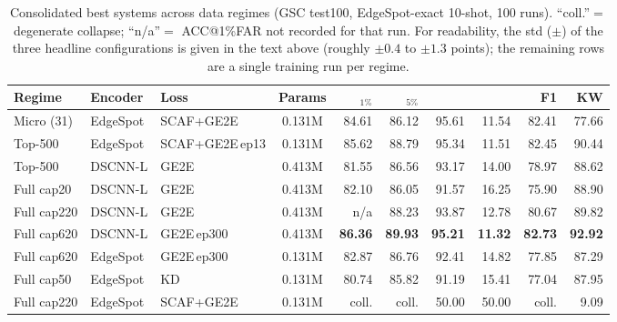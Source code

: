 \documentclass[12pt,a4paper]{report}
\newcommand{\acc}{\text{ACC}}
\newcommand{\eer}{\text{EER}}
\newcommand{\auc}{\text{AUC}}
\newcommand{\best}[1]{\textbf{#1}}
\begin{document}
\begin{table}[H]
\centering
\caption{Consolidated best systems across data regimes (GSC test100,
EdgeSpot-exact 10-shot, 100 runs). ``coll.''$=$ degenerate collapse; ``n/a''$=$
ACC@1\%FAR not recorded for that run. For readability, the std ($\pm$) of the three
headline configurations is given in the text above (roughly $\pm0.4$ to $\pm1.3$
points); the remaining rows are a single training run per regime.}
\label{tab:final}
\scriptsize
\setlength{\tabcolsep}{3pt}
\begin{tabular}{l l l c r r r r r r}
\toprule
\textbf{Regime} & \textbf{Encoder} & \textbf{Loss} & \textbf{Params} &
\acc$_{1\%}$ & \acc$_{5\%}$ & \auc & \eer & F1 & KW\\
\midrule
Micro (31)    & EdgeSpot & SCAF+GE2E      & 0.131M & 84.61 & 86.12 & 95.61 & 11.54 & 82.41 & 77.66 \\
Top-500       & EdgeSpot & SCAF+GE2E\,ep13& 0.131M & 85.62 & 88.79 & 95.34 & 11.51 & 82.45 & 90.44 \\
Top-500       & DSCNN-L  & GE2E           & 0.413M & 81.55 & 86.56 & 93.17 & 14.00 & 78.97 & 88.62 \\
Full cap20    & DSCNN-L  & GE2E           & 0.413M & 82.10 & 86.05 & 91.57 & 16.25 & 75.90 & 88.90 \\
Full cap220   & DSCNN-L  & GE2E           & 0.413M & n/a   & 88.23 & 93.87 & 12.78 & 80.67 & 89.82 \\
\rowcolor{blue!7}
Full cap620   & DSCNN-L  & GE2E\,ep300    & 0.413M & \best{86.36} & \best{89.93} & \best{95.21} & \best{11.32} & \best{82.73} & \best{92.92} \\
Full cap620   & EdgeSpot & GE2E\,ep300    & 0.131M & 82.87 & 86.76 & 92.41 & 14.82 & 77.85 & 87.29 \\
Full cap50    & EdgeSpot & KD             & 0.131M & 80.74 & 85.82 & 91.19 & 15.41 & 77.04 & 87.95 \\
Full cap220   & EdgeSpot & SCAF+GE2E      & 0.131M & coll. & coll. & 50.00 & 50.00 & coll. & 9.09 \\
\bottomrule
\end{tabular}
\end{table}
\end{document}
